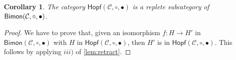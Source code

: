 \documentclass[nosumlimits,twoside]{amsart}
\newtheorem{corollary}[corollary]{\sc Corollary}
\theoremstyle{definition}
\theoremstyle{remark}
\def\revsn{\text{-}}
\newcommand{\id}{\mathrm{Id}}
\newcommand{\Cc}{\mathcal{C}}
\def\Bimon{{\sf Bimon}}
\begin{document}
\begin{corollary}
    The category $\mathsf{Hopf}(\Cc,\circ,\bullet)$ is a replete subcategory of $\Bimon(\Cc,\circ,\bullet)$.
\end{corollary}

\begin{proof}
    We have to prove that, given an isomorphism $f:H\to H'$ in $\mathsf{Bimon}(\Cc,\circ,\bullet)$ with $H$ in $\mathsf{Hopf}(\Cc,\circ,\bullet)$, then $H'$ is in $\mathsf{Hopf}(\Cc,\circ,\bullet)$. This follows by applying $iii)$ of \cref{lem:retract}.
\end{proof}
\end{document}
